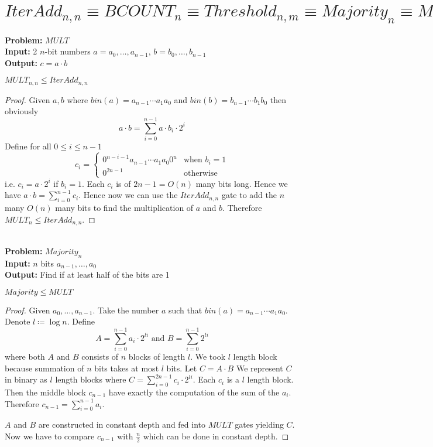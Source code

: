 \section{$IterAdd_{n,n}\equiv BCOUNT_n\equiv Threshold_{n,m} \equiv Majority_n\equiv MULT_{n}\equiv SORT_{n,n}$}
\textbf{Problem:} $MULT$\\
\textbf{Input:} 2 $n$-bit numbers $a=a_0,\dots,a_{n-1}$, $b=b_0,\dots,b_{n-1}$\\
\textbf{Output:} $c=a\cdot b$\\
\begin{theorem}\label{multaddrel}
	$MULT_{n,n}\leq IterAdd_{n,n}$
\end{theorem}
\begin{proof}
	Given $a,b$ where $bin(a)=a_{n-1}\cdots a_1a_0$ and $bin(b)=b_{n-1}\cdots b_1b_0$ then obviously $$a\cdot b=\sum\limits_{i=0}^{n-1}a\cdot b_i\cdot 2^i$$Define for all $0\leq i\leq n-1$ $$c_i=\begin{cases}
		0^{n-i-1}a_{n-1}\cdots a_1a_0 0^u & \text{when $b_i=1$}\\
		0^{2n-1} & \text{otherwise}
	\end{cases}$$i.e. $c_i=a\cdot 2^i$ if $b_i=1$. Each $c_i$ is of $2n-1=O(n) $ many bits long. Hence we have $a\cdot b=\sum\limits_{i=0}^{n-1} c_i$. Hence now we can use the $IterAdd_{n,n}$ gate to add the $n$ many $O(n)$ many bits to find the multiplication of $a$ and $b$. Therefore $MULT_n\leq IterAdd_{n,n}$.
\end{proof}\\
\textbf{Problem:} $Majority_n$\\
\textbf{Input:} $n$ bits $a_{n-1},\dots, a_0$\\
\textbf{Output:} Find if at least half of the bits are 1\\
\begin{theorem}\label{majmultrel}
	$Majority\leq MULT$
\end{theorem}
\begin{proof}
	Given $a_0,\dots,a_{n-1}$. Take the number $a$ such that $bin(a)=a_{n-1}\cdots a_1a_0$. Denote $l\coloneqq \log n$. Define $$A=\sum\limits_{i=0}^{n-1}a_i\cdot 2^{li}\text{ and }B=\sum\limits_{i=0}^{n-1}2^{li}$$where both $A$ and $B$ consists of $n$ blocks of length $l$. We took $l$ length block because summation of $n$ bits takes at most $l$ bits. Let $C=A\cdot B$ We represent $C$ in binary as $l$ length blocks where  $C=\sum\limits_{i=0}^{2n-1}c_i\cdot 2^{li}$. Each $c_i$ is a $l$ length block. Then the middle block $c_{n-1}$ have exactly the computation of the sum of the $a_i$. Therefore $c_{n-1}=\sum\limits_{i=0}^{n-1}a_i$.
	
	$A$ and $B$ are constructed in constant depth and fed into $MULT$ gates yielding $C$. Now we have to compare $c_{n-1}$ with $\frac{n}{2}$ which can be done in constant depth.
\end{proof}\\
